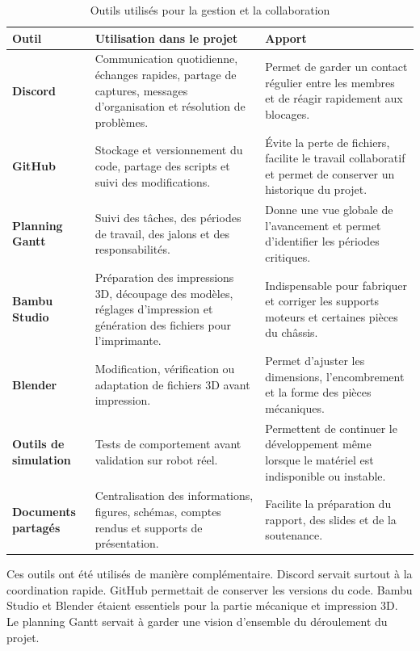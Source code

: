 \documentclass[11pt,a4paper]{report}
\begin{document}
\begin{table}[H]
\centering
\small
\renewcommand{\arraystretch}{1.25}
\begin{tabular}{|p{3.4cm}|p{5.2cm}|p{5.4cm}|}
\hline
\textbf{Outil} & \textbf{Utilisation dans le projet} & \textbf{Apport} \\
\hline
\textbf{Discord} &
Communication quotidienne, échanges rapides, partage de captures, messages d'organisation et résolution de problèmes. &
Permet de garder un contact régulier entre les membres et de réagir rapidement aux blocages. \\
\hline
\textbf{GitHub} &
Stockage et versionnement du code, partage des scripts et suivi des modifications. &
Évite la perte de fichiers, facilite le travail collaboratif et permet de conserver un historique du projet. \\
\hline
\textbf{Planning Gantt} &
Suivi des tâches, des périodes de travail, des jalons et des responsabilités. &
Donne une vue globale de l'avancement et permet d'identifier les périodes critiques. \\
\hline
\textbf{Bambu Studio} &
Préparation des impressions 3D, découpage des modèles, réglages d'impression et génération des fichiers pour l'imprimante. &
Indispensable pour fabriquer et corriger les supports moteurs et certaines pièces du châssis. \\
\hline
\textbf{Blender} &
Modification, vérification ou adaptation de fichiers 3D avant impression. &
Permet d'ajuster les dimensions, l'encombrement et la forme des pièces mécaniques. \\
\hline
\textbf{Outils de simulation} &
Tests de comportement avant validation sur robot réel. &
Permettent de continuer le développement même lorsque le matériel est indisponible ou instable. \\
\hline
\textbf{Documents partagés} &
Centralisation des informations, figures, schémas, comptes rendus et supports de présentation. &
Facilite la préparation du rapport, des slides et de la soutenance. \\
\hline
\end{tabular}
\caption{Outils utilisés pour la gestion et la collaboration}
\label{tab:outils_gestion}
\end{table}

Ces outils ont été utilisés de manière complémentaire. Discord servait surtout à la coordination rapide. GitHub permettait de conserver les versions du code. Bambu Studio et Blender étaient essentiels pour la partie mécanique et impression 3D. Le planning Gantt servait à garder une vision d'ensemble du déroulement du projet.
\end{document}
